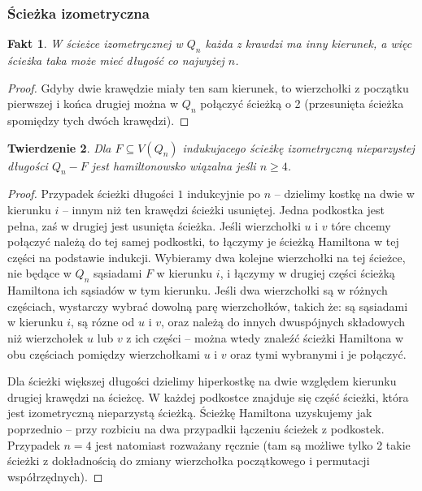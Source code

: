 \documentclass{pracamgr}
\newtheorem{theorem}{Twierdzenie}
\newtheorem{fact}[theorem]{Fakt}
\begin{document}
    \subsubsection{Ścieżka izometryczna}
     \begin{fact}\label{sciezka izo - rozne kierunki}
      W ścieżce izometrycznej w $Q_n$ każda z krawdzi ma inny kierunek, a więc ścieżka taka może mieć długość co najwyżej $n$.
     \end{fact}
     \begin{proof}
      Gdyby dwie krawędzie miały ten sam kierunek, to wierzchołki z początku pierwszej i końca drugiej można w $Q_n$ połączyć ścieżką o 2
      (przesunięta ścieżka spomiędzy tych dwóch krawędzi).
     \end{proof}
     \begin{theorem}\label{hamilton - sciezka, nieparz} %
      Dla $F\subseteq V(Q_n)$ indukujacego ścieżkę izometryczną nieparzystej długości $Q_n-F$ jest hamiltonowsko wiązalna jeśli $n\ge4$.
     \end{theorem}
     \begin{proof}
      Przypadek ścieżki długości $1$ indukcyjnie po $n$ -- dzielimy kostkę na dwie w kierunku $i$ -- innym niż ten krawędzi ścieżki usuniętej.
      Jedna podkostka jest pełna, zaś w drugiej jest usunięta ścieżka. Jeśli wierzchołki $u$ i $v$ tóre chcemy połączyć należą do tej samej
      podkostki, to łączymy je ścieżką Hamiltona w tej części na podstawie indukcji. Wybieramy dwa kolejne wierzchołki na tej ścieżce,
      nie będące w $Q_n$ sąsiadami $F$ w kierunku $i$, i łączymy w drugiej części ścieżką Hamiltona ich sąsiadów w tym kierunku.\newline
      Jeśli dwa wierzchołki są w różnych częściach, wystarczy wybrać dowolną parę wierzchołków, takich że: są sąsiadami w kierunku $i$, są rózne od
      $u$ i $v$, oraz należą do innych dwuspójnych składowych niż wierzchołek $u$ lub $v$ z ich części
      -- można wtedy znaleźć ścieżki Hamiltona w obu częściach pomiędzy wierzchołkami $u$ i $v$ oraz tymi wybranymi i je połączyć.\newline
      
      Dla ścieżki większej długości dzielimy hiperkostkę na dwie względem kierunku drugiej krawędzi na ścieżcę. W każdej podkostce znajduje się część ścieżki,
      która jest izometryczną nieparzystą ścieżką. Ścieżkę Hamiltona uzyskujemy jak poprzednio -- przy rozbiciu na dwa przypadkii łączeniu ścieżek z podkostek.
      Przypadek $n=4$ jest natomiast rozważany ręcznie
      (tam są możliwe tylko 2 takie ścieżki z dokładnością do zmiany wierzchołka początkowego i permutacji współrzędnych).
     \end{proof}
\end{document}
